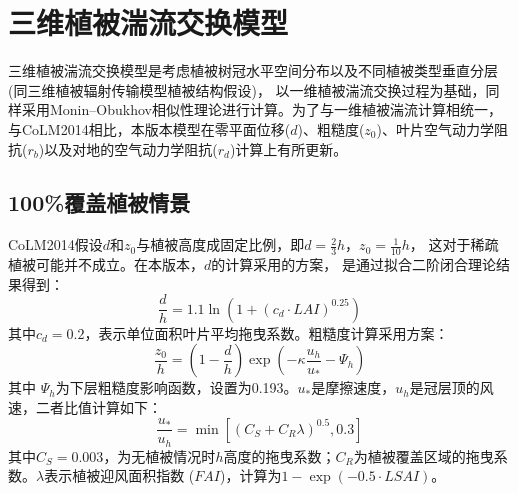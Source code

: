 \section{三维植被湍流交换模型}
三维植被湍流交换模型是考虑植被树冠水平空间分布以及不同植被类型垂直分层(同三维植被辐射传输模型植被结构假设)，
以一维植被湍流交换过程为基础，同样采用Monin–Obukhov相似性理论进行计算。为了与一维植被湍流计算相统一，
与CoLM2014相比，本版本模型在零平面位移($d$)、粗糙度($z_0$)、叶片空气动力学阻抗($r_b$)以及对地的空气动力学阻抗($r_d$)计算上有所更新。
\subsection{100\%覆盖植被情景}
CoLM2014假设$d$和$z_0$与植被高度成固定比例，即$d=\frac{2}{3}h$，$z_0=\frac{1}{10}h$，
这对于稀疏植被可能并不成立\citep{zeng2007consistent}。在本版本，$d$的计算采用\citet{choudhury1988}的方案，
是通过拟合\citet{shaw1982aerodynamic}二阶闭合理论结果得到：
\begin{equation}\label{dOh}
\frac{d}{h}=1.1 \ln \left(1+\left(c_{d} \cdot LAI \right)^{0.25}\right)
\end{equation}
其中$c_d=0.2$，表示单位面积叶片平均拖曳系数。粗糙度计算采用\citet{raupach1992drag,raupach1994simplified}方案：
\begin{equation}\label{zOh}
\frac{z_{0}}{h}=\left(1-\frac{d}{h}\right) \exp \left(-\kappa \frac{u_{h}}{u_{*}}-\Psi_{h}\right)
\end{equation}
其中%
$\Psi_h$为下层粗糙度影响函数，设置为0.193。$u_\ast$是摩擦速度，$u_h$是冠层顶的风速，二者比值计算如下：
\begin{equation}\label{ustrarOuh}
\frac{u_{*}}{u_{h}}=\min \left[\left(C_{S}+C_{R} \lambda\right)^{0.5}, 0.3\right]
\end{equation}
其中$C_S=0.003$，为无植被情况时$h$高度的拖曳系数；$C_R$为植被覆盖区域的拖曳系数。$\lambda$表示植被迎风面积指数 ($FAI$)，计算为$1-\exp{\left(-0.5 \cdot LSAI\right)}$。



